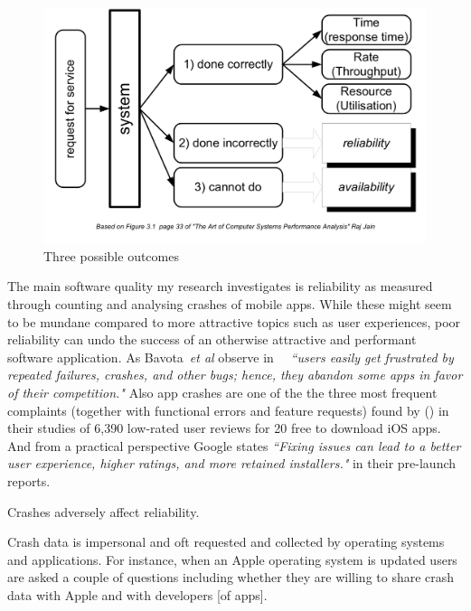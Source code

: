 \begin{figure}[htbp!]
    \centering
    \includegraphics[width=14cm]{images/commercetest/raj-jain-performance-reliability-availability.png}
    \caption{Three possible outcomes}
    \label{fig:three-possible-ourcomes}
\end{figure}

The main software quality my research investigates is reliability as measured through counting and analysing crashes of mobile apps. While these might seem to be mundane compared to more attractive topics such as user experiences, poor reliability can undo the success of an otherwise attractive and performant software application. As Bavota~\emph{et al} observe in~\cite{bavota2014_impact_of_api_change_android} ~\emph{``users easily get frustrated by repeated failures, crashes, and other bugs; hence, they abandon some apps in favor of their competition."} Also app crashes are one of the the three most frequent complaints (together with functional errors and feature requests) found by (\cite{khalid2015_what_do_mobile_app_users_complain_about}) in their studies of 6,390 low-rated user reviews for 20 free to download iOS apps. And from a practical perspective Google states \emph{``Fixing issues can lead to a better user experience, higher ratings, and more retained installers."} in their pre-launch reports.

Crashes adversely affect reliability.



Crash data is impersonal and oft requested and collected by operating systems and applications. For instance, when an Apple operating system is updated users are asked a couple of questions including whether they are willing to share crash data with Apple and with developers [of apps].

